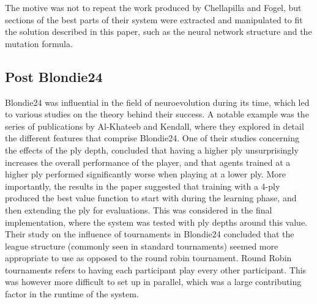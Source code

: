 \documentclass[12pt,a4paper]{article}
\begin{document}
        The motive was not to repeat the work produced by Chellapilla and Fogel, but sections of the best parts of their system were extracted and manipulated to fit the solution described in this paper, such as the neural network structure and the mutation formula. 

    \subsection{Post Blondie24}

        Blondie24 was influential in the field of neuroevolution during its time, which led to various studies on the theory behind their success. A notable example was the series of publications by Al-Khateeb and Kendall, where they explored in detail the different features that comprise Blondie24. One of their studies concerning the effects of the ply depth, concluded that having a higher ply unsurprisingly increases the overall performance of the player, and that agents trained at a higher ply performed significantly worse when playing at a lower ply. More importantly, the results in the paper suggested that training with a 4-ply produced the best value function to start with during the learning phase, and then extending the ply for evaluations. \cite{al-khateeb_effect_2012} This was considered in the final implementation, where the system was tested with ply depths around this value. 
        Their study on the influence of tournaments in Blondie24 concluded that the league structure (commonly seen in standard tournaments) seemed more appropriate to use as opposed to the round robin tournament. \cite{al-khateeb_introducing_2009} Round Robin tournaments refers to having each participant play every other participant. This was however more difficult to set up in parallel, which was a large contributing factor in the runtime of the system.
        
\end{document}
